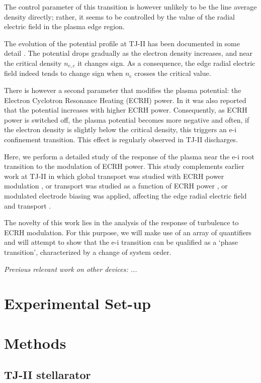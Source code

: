 \documentclass[preprint,12pt,authoryear]{elsarticle}
\begin{document}
The control parameter of this transition is however unlikely to be the line average density directly;
rather, it seems to be controlled by the value of the radial electric field in the plasma edge region.

The evolution of the potential profile at TJ-II has been documented in some detail \cite{Melnikov:2011}.
The potential drops gradually as the electron density increases, and near the critical density $n_{e,c}$ it changes sign.
As a consequence, the edge radial electric field indeed tends to change sign when $n_e$ crosses the critical value.

There is however a second parameter that modifies the plasma potential: the Electron Cyclotron Resonance Heating (ECRH) power.
In \cite{Melnikov:2011} it was also reported that the potential increases with higher ECRH power.
Consequently, as ECRH power is switched off, the plasma potential becomes more negative and often, if the electron density is slightly below the critical density, this triggers an e-i confinement transition.
This effect is regularly observed in TJ-II discharges.

Here, we perform a detailed study of the response of the plasma near the e-i root transition to the modulation of ECRH power.
This study complements earlier work at TJ-II in which global transport was studied with ECRH power modulation \cite{S_Eguilior_2003}, or transport was studied as a function of ECRH power \cite{Milligen:2018b}, or modulated electrode biasing was applied, affecting the edge radial electric field and transport \cite{Grenfell:2019}.

The novelty of this work lies in the analysis of the response of turbulence to ECRH modulation.
For this purpose, we will make use of an array of quantifiers and will attempt to show that the e-i transition can be qualified as a `phase transition', characterized by a change of system order.

{\em Previous relevant work on other devices: ...}

\section{Experimental Set-up}

\section{Methods}

\subsection{TJ-II stellarator}
\end{document}
